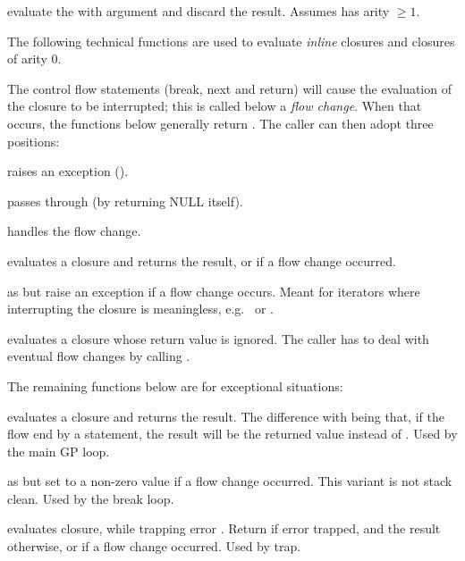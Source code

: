  evaluate the 
 with argument  and discard the result. Assumes 
has arity $\geq 1$.

The following technical functions are used to evaluate \emph{inline}
closures and closures of arity 0.

The control flow statements (break, next and return) will cause the
evaluation of the closure to be interrupted; this is called below a
\emph{flow change}. When that occurs, the functions below generally
 return . The caller can then adopt three positions:

\item raises an exception ().

\item passes through (by returning NULL itself).

\item handles the flow change.

 evaluates a closure and returns the result,
or  if a flow change occurred.

 as  but raise
an exception if a flow change occurs. Meant for iterators where
interrupting the closure is meaningless, e.g.~ or .

 evaluates a closure whose return
value is ignored. The caller has to deal with eventual flow changes by
calling .

The remaining functions below are for exceptional situations:

 evaluates a closure and returns the result.
The difference with  being that, if the flow end by a
 statement, the result will be the returned value instead of
. Used by the main GP loop.

 as 
but set  to a non-zero value if a flow change occurred. This
variant is not stack clean. Used by the break loop.

 evaluates closure, while
trapping error . Return  if error trapped, and the
result otherwise, or  if a flow change occurred. Used by trap.



